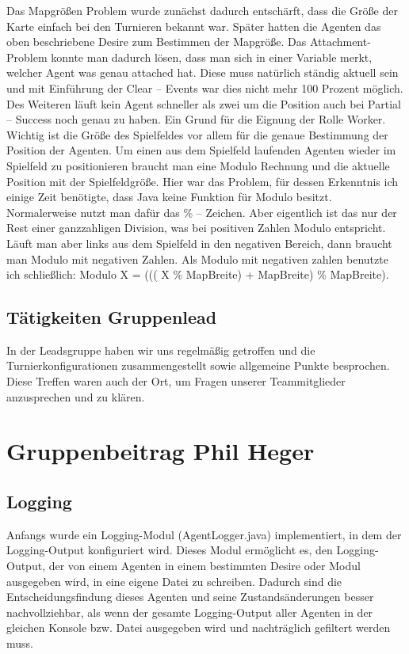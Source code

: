\documentclass[runningheads]{llncs}
\begin{document}
Das Mapgrößen Problem wurde zunächst dadurch entschärft, dass die Größe der Karte einfach bei den Turnieren bekannt war. Später hatten die Agenten das oben beschriebene Desire zum Bestimmen der Mapgröße.
Das Attachment-Problem konnte man dadurch lösen, dass man sich in einer Variable merkt, welcher Agent was genau attached hat. Diese muss natürlich ständig aktuell sein und mit Einführung der Clear – Events war dies nicht mehr 100 Prozent möglich. Des Weiteren läuft kein Agent schneller als zwei um die Position auch bei Partial – Success noch genau zu haben. Ein Grund für die Eignung der Rolle Worker.\\

Wichtig ist die Größe des Spielfeldes vor allem für die genaue Bestimmung der Position der Agenten. Um einen aus dem Spielfeld laufenden Agenten wieder im Spielfeld zu positionieren braucht man eine Modulo Rechnung und die aktuelle Position mit der Spielfeldgröße. Hier war das Problem, für dessen Erkenntnis ich einige Zeit benötigte, dass Java keine Funktion für Modulo besitzt. Normalerweise nutzt man dafür das \% – Zeichen. Aber eigentlich ist das nur der Rest einer ganzzahligen Division, was bei positiven Zahlen Modulo entspricht. Läuft man aber links aus dem Spielfeld in den negativen Bereich, dann braucht man Modulo mit negativen Zahlen.  Als Modulo mit negativen zahlen benutzte ich schließlich: 
Modulo X = ((( X \% MapBreite) + MapBreite) \% MapBreite). 

\subsection{Tätigkeiten Gruppenlead}
In der Leadsgruppe haben wir uns regelmäßig getroffen und die Turnierkonfigurationen zusammengestellt sowie allgemeine Punkte besprochen. Diese Treffen waren auch der Ort, um Fragen unserer Teammitglieder anzusprechen und zu klären. 
\section{Gruppenbeitrag Phil Heger}
\subsection{Logging}
Anfangs wurde ein Logging-Modul (AgentLogger.java) implementiert, in dem der Logging-Output konfiguriert wird. Dieses Modul ermöglicht es, den Logging-Output, der von einem Agenten in einem bestimmten Desire oder Modul ausgegeben wird, in eine eigene Datei zu schreiben. Dadurch sind die Entscheidungsfindung dieses Agenten und seine Zustandsänderungen besser nachvollziehbar, als wenn der gesamte Logging-Output aller Agenten in der gleichen Konsole bzw. Datei ausgegeben wird und nachträglich gefiltert werden muss. 
\end{document}
